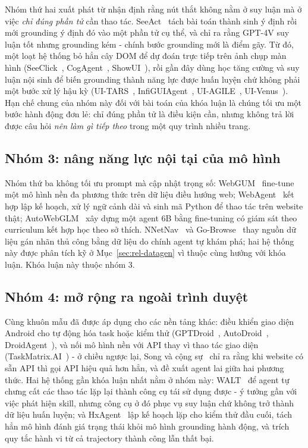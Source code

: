 Nhóm thứ hai xuất phát từ nhận định rằng nút thắt không nằm ở suy luận mà ở
việc \emph{chỉ đúng phần tử} cần thao tác. SeeAct~\cite{zheng2024seeact} tách
bài toán thành sinh ý định rồi mới grounding ý định đó vào một phần tử cụ thể,
và chỉ ra rằng GPT-4V suy luận tốt nhưng grounding kém - chính bước grounding
mới là điểm gãy. Từ đó, một loạt hệ thống bỏ hẳn cây DOM để dự đoán trực tiếp
trên ảnh chụp màn hình (SeeClick~\cite{cheng2024seeclick},
CogAgent~\cite{hong2024cogagent}, ShowUI~\cite{lin2024showui}), rồi gần đây
dùng học tăng cường và suy luận nội sinh để biến grounding thành năng lực được
huấn luyện chứ không phải một bước xử lý hậu kỳ (UI-TARS~\cite{qin2025uitars},
InfiGUIAgent~\cite{liu2025infiguiagent}, UI-AGILE~\cite{lian2025uiagile},
UI-Venus~\cite{gu2025uivenus}). Hạn chế chung của nhóm này đối với bài toán của
khóa luận là chúng tối ưu một bước hành động đơn lẻ: chỉ đúng phần tử là điều
kiện cần, nhưng không trả lời được câu hỏi \emph{nên làm gì tiếp theo} trong
một quy trình nhiều trang.

\subsection{Nhóm 3: nâng năng lực nội tại của mô hình}

Nhóm thứ ba không tối ưu prompt mà cập nhật trọng số:
WebGUM~\cite{furuta2024webgum} fine-tune một mô hình nền đa phương thức trên dữ
liệu điều hướng web; WebAgent~\cite{gur2024webagent} kết hợp lập kế hoạch, xử
lý ngữ cảnh dài và sinh mã Python để thao tác trên website thật;
AutoWebGLM~\cite{lai2024autowebglm} xây dựng một agent 6B bằng fine-tuning có
giám sát theo curriculum kết hợp học theo sở thích. NNetNav~\cite{murty2024nnetnav}
và Go-Browse~\cite{gandhi2026gobrowse} thay nguồn dữ liệu gán nhãn thủ công
bằng dữ liệu do chính agent tự khám phá; hai hệ thống này được phân tích kỹ ở
Mục~\ref{sec:rel-datagen} vì thuộc cùng hướng với khóa luận. Khóa luận này
thuộc nhóm 3.

\subsection{Nhóm 4: mở rộng ra ngoài trình duyệt}

Cùng khuôn mẫu đã được áp dụng cho các nền tảng khác: điều khiển giao diện
Android cho tự động hóa task hoặc kiểm thử (GPTDroid~\cite{liu2023gptdroid},
AutoDroid~\cite{wen2024autodroid}, DroidAgent~\cite{yoon2023droidagent}), và
nối mô hình nền với API thay vì thao tác giao diện
(TaskMatrix.AI~\cite{liang2023taskmatrix}) - ở chiều ngược lại, Song và cộng
sự~\cite{song2025apiagents} chỉ ra rằng khi website có sẵn API thì gọi API hiệu
quả hơn hẳn, và đề xuất agent lai giữa hai phương thức. Hai hệ thống gần khóa
luận nhất nằm ở nhóm này: WALT~\cite{prabhu2025walt} để agent tự chưng cất các
thao tác lặp lại thành công cụ tái sử dụng được - ý tưởng gần với việc phát
hiện skill, nhưng công cụ ở đó phục vụ suy luận chứ không trở thành dữ liệu
huấn luyện; và HxAgent~\cite{hxagent2026} lập kế hoạch lặp cho kiểm thử đầu
cuối, tách hẳn mô hình đánh giá trạng thái khỏi mô hình grounding hành động, và
trích quy tắc hành vi từ cả trajectory thành công lẫn thất bại.

